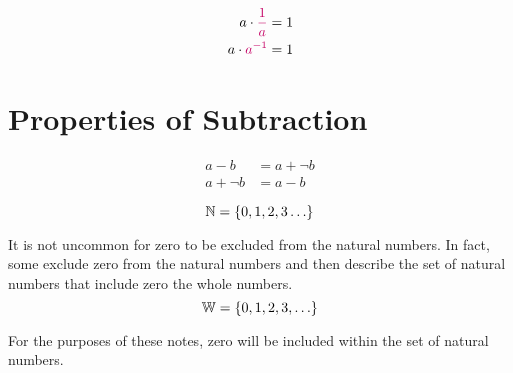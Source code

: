 \documentclass[20150903-160354-rs2.2-MarksMathNotebook.tex]{subfiles}
\begin{document}
\begin{definition}
\begin{subequations}
\begin{align}
a \cdot \alert{\dfrac{1}{a}} &= 1 \label{eq:mi1} \\
a \cdot \alert{a^{-1}} &= 1 \label{eq:mi2}
\end{align}
\end{subequations}
\end{definition}


\section{Properties of Subtraction}



\begin{definition}
\begin{subequations}
\begin{align}
a-b &= a+\neg b \label{eq:dos1} \\
a+\neg b &= a-b \label{eq:dos2}
\end{align}
\end{subequations}
\end{definition}


\begin{definition}

\[
\mathbb{N}=\left\{0, 1, 2, 3 \ldots\right\}
\]

\end{definition}

\begin{remark}
It is not uncommon for zero to be excluded from the natural numbers.  In fact, some exclude zero from the natural numbers and then describe the set of natural numbers that include zero the whole numbers. \\

\[
\mathbb{W}=\left\{0, 1, 2, 3, \ldots\right\}
\]

For the purposes of these notes, zero will be included within the set of natural numbers.
\end{remark}
\end{document}
